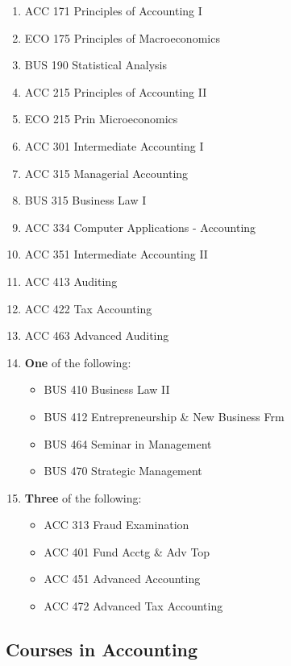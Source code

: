\documentclass[
  letterpaper,
]{scrbook}
\providecommand{\tightlist}{%
  \setlength{\itemsep}{0pt}\setlength{\parskip}{0pt}}
\begin{document}
\begin{enumerate}
\def\labelenumi{\arabic{enumi}.}
\item
  ACC 171 Principles of Accounting I
\item
  ECO 175 Principles of Macroeconomics
\item
  BUS 190 Statistical Analysis
\item
  ACC 215 Principles of Accounting II
\item
  ECO 215 Prin Microeconomics
\item
  ACC 301 Intermediate Accounting I
\item
  ACC 315 Managerial Accounting
\item
  BUS 315 Business Law I
\item
  ACC 334 Computer Applications - Accounting
\item
  ACC 351 Intermediate Accounting II
\item
  ACC 413 Auditing
\item
  ACC 422 Tax Accounting
\item
  ACC 463 Advanced Auditing
\item
  \textbf{One} of the following:

  \begin{itemize}
  \tightlist
  \item
    BUS 410 Business Law II
  \item
    BUS 412 Entrepreneurship \& New Business Frm
  \item
    BUS 464 Seminar in Management
  \item
    BUS 470 Strategic Management
  \end{itemize}
\item
  \textbf{Three} of the following:

  \begin{itemize}
  \tightlist
  \item
    ACC 313 Fraud Examination
  \item
    ACC 401 Fund Acctg \& Adv Top
  \item
    ACC 451 Advanced Accounting
  \item
    ACC 472 Advanced Tax Accounting
  \end{itemize}
\end{enumerate}

\subsection{Courses in Accounting}\label{courses-in-accounting}
\end{document}
